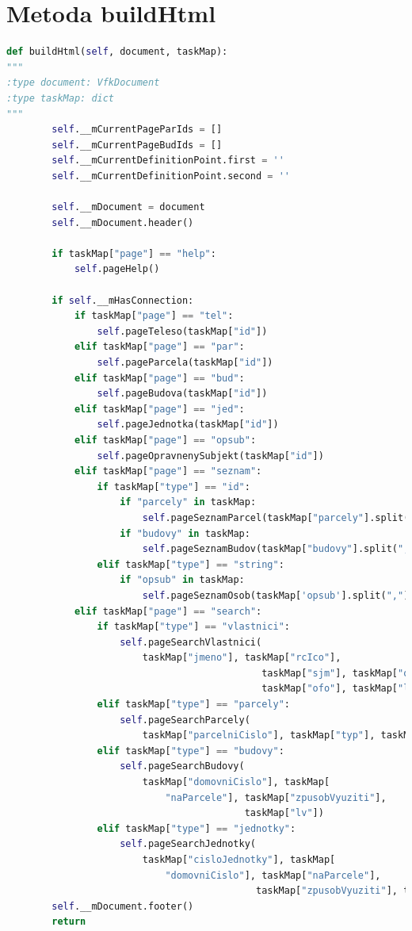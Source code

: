 \documentclass[a4paper,12pt,oneside]{book}
\begin{document}
\section{Metoda buildHtml}

\begin{lstlisting}[language=Python, 
		    keywordstyle=\color{blue}\ttfamily,
		    stringstyle=\color{red}\ttfamily,
		    commentstyle=\color{green}\ttfamily, morekeywords={qDebug,QString,QgsVectorLayer,QgsMapLayerRegistry,QMessageBox,self},
		    label=l_buildHtml]
def buildHtml(self, document, taskMap):
"""
:type document: VfkDocument
:type taskMap: dict
"""
        self.__mCurrentPageParIds = []
        self.__mCurrentPageBudIds = []
        self.__mCurrentDefinitionPoint.first = ''
        self.__mCurrentDefinitionPoint.second = ''

        self.__mDocument = document
        self.__mDocument.header()

        if taskMap["page"] == "help":
            self.pageHelp()

        if self.__mHasConnection:
            if taskMap["page"] == "tel":
                self.pageTeleso(taskMap["id"])
            elif taskMap["page"] == "par":
                self.pageParcela(taskMap["id"])
            elif taskMap["page"] == "bud":
                self.pageBudova(taskMap["id"])
            elif taskMap["page"] == "jed":
                self.pageJednotka(taskMap["id"])
            elif taskMap["page"] == "opsub":
                self.pageOpravnenySubjekt(taskMap["id"])
            elif taskMap["page"] == "seznam":
                if taskMap["type"] == "id":
                    if "parcely" in taskMap:
                        self.pageSeznamParcel(taskMap["parcely"].split(","))
                    if "budovy" in taskMap:
                        self.pageSeznamBudov(taskMap["budovy"].split(","))
                elif taskMap["type"] == "string":
                    if "opsub" in taskMap:
                        self.pageSeznamOsob(taskMap['opsub'].split(","))
            elif taskMap["page"] == "search":
                if taskMap["type"] == "vlastnici":
                    self.pageSearchVlastnici(
                        taskMap["jmeno"], taskMap["rcIco"],
                                             taskMap["sjm"], taskMap["opo"],
                                             taskMap["ofo"], taskMap["lv"])
                elif taskMap["type"] == "parcely":
                    self.pageSearchParcely(
                        taskMap["parcelniCislo"], taskMap["typ"], taskMap["druh"], taskMap["lv"])
                elif taskMap["type"] == "budovy":
                    self.pageSearchBudovy(
                        taskMap["domovniCislo"], taskMap[
                            "naParcele"], taskMap["zpusobVyuziti"],
                                          taskMap["lv"])
                elif taskMap["type"] == "jednotky":
                    self.pageSearchJednotky(
                        taskMap["cisloJednotky"], taskMap[
                            "domovniCislo"], taskMap["naParcele"],
                                            taskMap["zpusobVyuziti"], taskMap["lv"])
        self.__mDocument.footer()
        return
\end{lstlisting}
\end{document}
